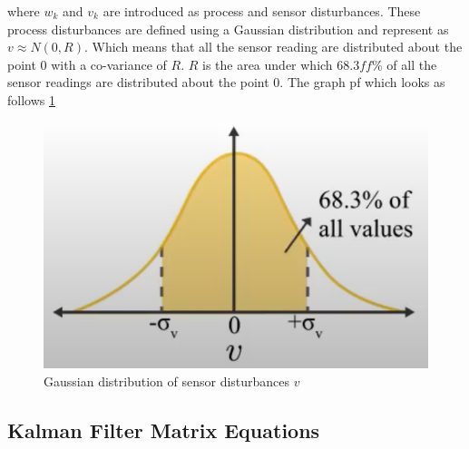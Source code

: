 where $w_{k}$ and $v_{k}$ are introduced as process and sensor disturbances. These process disturbances are defined using a Gaussian distribution and represent as $v \approx N(0, R)$. Which means that all the sensor reading are distributed about the point $0$ with a co-variance of $R$. $R$ is the area under which $68.3ff\%$ of all the sensor readings are distributed about the point $0$. The graph pf which looks as follows \ref{fig_Gaussian_dist_v}
\begin{figure}[h!]
	\centering
	\includegraphics[width=0.5\linewidth]{Bilder/Gaussian_distrubution_v.PNG}
	\caption{Gaussian distribution of sensor disturbances $v$}
	\label{fig_Gaussian_dist_v}
\end{figure}

\subsection{Kalman Filter Matrix Equations}


